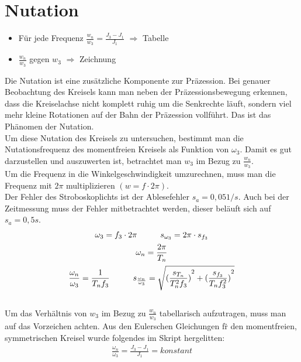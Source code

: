 

\section{Nutation}

\begin{itemize}
    \item Für jede Frequenz $\frac{w_n}{w_3} = \frac{J_3-J_1}{J_1}$ $\Rightarrow$ Tabelle
    \item $\frac{w_n}{w_3}$ gegen $w_3$ $\Rightarrow$ Zeichnung
\end{itemize}

Die Nutation ist eine zus\"atzliche Komponente zur Präzession. Bei genauer Beobachtung des Kreisels kann man neben der Präzessionsbewegung erkennen, dass die Kreiselachse nicht komplett ruhig um die Senkrechte läuft, sondern viel mehr kleine Rotationen auf der Bahn der Präzession vollführt. Das ist das Phänomen der Nutation.\\
Um diese Nutation des Kreisels zu untersuchen, bestimmt man die Nutationsfrequenz des momentfreien Kreisels als Funktion von $\omega_3$. Damit es gut darzustellen und auszuwerten ist, betrachtet man $w_3$ im Bezug zu $\frac{w_n}{w_3}$. \\
Um die Frequenz in die Winkelgeschwindigkeit umzurechnen, muss man die Frequenz mit $2\pi$ multiplizieren $(w = f\cdot2\pi)$.\\
Der Fehler des Stroboskoplichts ist der Ablesefehler $s_a = 0,05 1/s$. %
Auch bei der Zeitmessung muss der Fehler mitbetrachtet werden, dieser beläuft sich auf $s_a = 0,5s$.
\begin{gather}
    \omega_3 = f_3\cdot2\pi  \tab s_{\omega_3}=2\pi\cdot{s_{f_3}} \\[0.3mm]
    \omega_n = \frac{2\pi}{T_n} \\[0.3mm]
    \frac{\omega_n}{\omega_3} = \frac{1}{T_nf_3} 
    \tab s_{\frac{\omega_n}{\omega_3}} = \sqrt{{(\frac{s_{T_n}}{T_n^2f_3})}^2+{(\frac{s_{f_3}}{T_nf_3^2})}^2} 
\end{gather} \\
Um das Verh\"altnis von $w_3$ im Bezug zu $\frac{w_n}{w_3}$ tabellarisch aufzutragen, muss man auf das Vorzeichen achten. Aus den Eulerschen Gleichungen f\"r den momentfreien, symmetrischen Kreisel wurde folgendes im Skript hergelitten:
\begin{align}
    \frac{\omega_n}{\omega_3} = \frac{J_3 - J_1}{J_1} = konstant
\end{align} \\
